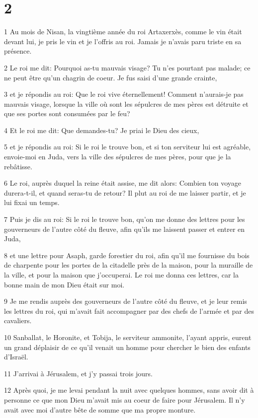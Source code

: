 \chapter{2}

\par 1 Au mois de Nisan, la vingtième année du roi Artaxerxès, comme le vin était devant lui, je pris le vin et je l'offris au roi. Jamais je n'avais paru triste en sa présence.
\par 2 Le roi me dit: Pourquoi as-tu mauvais visage? Tu n'es pourtant pas malade; ce ne peut être qu'un chagrin de coeur. Je fus saisi d'une grande crainte,
\par 3 et je répondis au roi: Que le roi vive éternellement! Comment n'aurais-je pas mauvais visage, lorsque la ville où sont les sépulcres de mes pères est détruite et que ses portes sont consumées par le feu?
\par 4 Et le roi me dit: Que demandes-tu? Je priai le Dieu des cieux,
\par 5 et je répondis au roi: Si le roi le trouve bon, et si ton serviteur lui est agréable, envoie-moi en Juda, vers la ville des sépulcres de mes pères, pour que je la rebâtisse.
\par 6 Le roi, auprès duquel la reine était assise, me dit alors: Combien ton voyage durera-t-il, et quand seras-tu de retour? Il plut au roi de me laisser partir, et je lui fixai un temps.
\par 7 Puis je dis au roi: Si le roi le trouve bon, qu'on me donne des lettres pour les gouverneurs de l'autre côté du fleuve, afin qu'ils me laissent passer et entrer en Juda,
\par 8 et une lettre pour Asaph, garde forestier du roi, afin qu'il me fournisse du bois de charpente pour les portes de la citadelle près de la maison, pour la muraille de la ville, et pour la maison que j'occuperai. Le roi me donna ces lettres, car la bonne main de mon Dieu était sur moi.
\par 9 Je me rendis auprès des gouverneurs de l'autre côté du fleuve, et je leur remis les lettres du roi, qui m'avait fait accompagner par des chefs de l'armée et par des cavaliers.
\par 10 Sanballat, le Horonite, et Tobija, le serviteur ammonite, l'ayant appris, eurent un grand déplaisir de ce qu'il venait un homme pour chercher le bien des enfants d'Israël.
\par 11 J'arrivai à Jérusalem, et j'y passai trois jours.
\par 12 Après quoi, je me levai pendant la nuit avec quelques hommes, sans avoir dit à personne ce que mon Dieu m'avait mis au coeur de faire pour Jérusalem. Il n'y avait avec moi d'autre bête de somme que ma propre monture.
